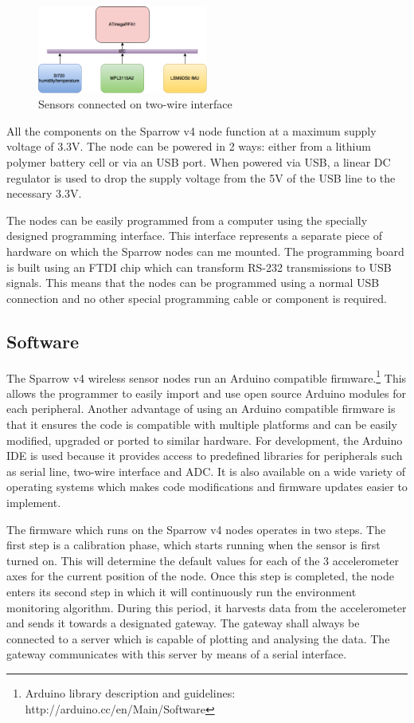 \begin{figure}[ht] \centering
  \includegraphics[width=0.5\textwidth]{img/i2c-conn.png}
  \caption{Sensors connected on two-wire interface}
\end{figure}

All the components on the Sparrow v4 node function at a maximum supply voltage of 3.3V. The node can be powered in 2 ways: either from a lithium polymer battery 
cell or via an USB port. When powered via USB, a linear DC regulator is used to drop the supply voltage from the 5V of the USB line to the necessary 3.3V.

The nodes can be easily programmed from a computer using the specially designed programming interface. This interface represents a separate piece of hardware
on which the Sparrow nodes can me mounted. The programming board is built using an FTDI chip which can transform RS-232 transmissions to USB signals. This means 
that the nodes can be programmed using a normal USB connection and no other special programming cable or component is required.

\subsection{Software}

The Sparrow v4 wireless sensor nodes run an Arduino compatible firmware.\footnote{Arduino library description and guidelines: http://arduino.cc/en/Main/Software}
This allows the programmer to easily import 
and use open source Arduino modules for each peripheral. Another advantage of using an Arduino compatible firmware is that it ensures the code is 
compatible with multiple platforms and can be easily modified, upgraded or ported to similar hardware. For development, the Arduino IDE is used 
because it provides access to predefined libraries for peripherals such as serial line, two-wire interface and ADC. It is also available on a wide 
variety of operating systems which makes code modifications and firmware updates easier to implement.

The firmware which runs on the Sparrow v4 nodes operates in two steps. The first step is a calibration phase, which starts running when the sensor 
is first turned on. This will determine the default values for each of the 3 accelerometer axes for the current position of the node. Once this step 
is completed, the node enters its second step in which it will continuously run the environment monitoring algorithm. During this period, it harvests data 
from the accelerometer and sends it towards a designated gateway. The gateway shall always be connected to a server 
which is capable of plotting and analysing the data. The gateway communicates with this server by means of a serial interface.

